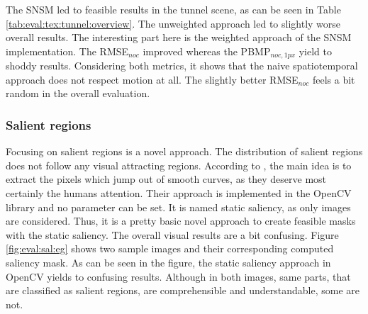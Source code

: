 \noindent The SNSM led to feasible results in the tunnel scene, as can be seen in Table \ref{tab:eval:tex:tunnel:overview}.
The unweighted approach led to slightly worse overall results.
The interesting part here is the weighted approach of the SNSM implementation.
The RMSE$_{noc}$ improved whereas the PBMP$_{noc,1px}$ yield to shoddy results.
Considering both metrics, it shows that the naive spatiotemporal approach does not respect motion at all.
The slightly better RMSE$_{noc}$ feels a bit random in the overall evaluation.

\subsubsection{Salient regions}

Focusing on salient regions is a novel approach.
The distribution of salient regions does not follow any visual attracting regions.
According to \citeauthor{hou2007saliency} \citep{hou2007saliency}, the main idea is to extract the pixels which jump out of smooth curves, as they deserve most certainly the humans attention.
Their approach is implemented in the OpenCV library and no parameter can be set.
It is named static saliency, as only images are considered.
Thus, it is a pretty basic novel approach to create feasible masks with the static saliency.
The overall visual results are a bit confusing.
Figure \ref{fig:eval:sal:eg} shows two sample images and their corresponding computed saliency mask.
As can be seen in the figure, the static saliency approach in OpenCV yields to confusing results.
Although in both images, same parts, that are classified as salient regions, are comprehensible and understandable, some are not.

